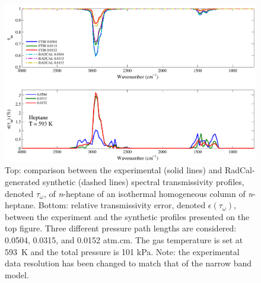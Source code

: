 \begin{figure}[p]
\includegraphics[width=\textwidth]{../Verification/Results_Test2/Heptane_593.pdf}
\caption{Top: comparison between the experimental (solid lines) and RadCal-generated synthetic (dashed lines) spectral transmissivity profiles, denoted $\tau_{\omega}$, of \textit{n}-heptane of an isothermal homogeneous column of \textit{n}-heptane. Bottom: relative transmissivity error, denoted $\epsilon{(\tau_{\omega})}$, between the experiment and the synthetic profiles presented on the top figure. Three different pressure path lengths are considered: 0.0504, 0.0315, and 0.0152 atm.cm. The gas temperature is set at 593~K and the total pressure is 101 kPa. Note: the experimental data resolution has been changed to match that of the narrow band model. \label{fig:nheptane_Verify_593K}}
\end{figure}

